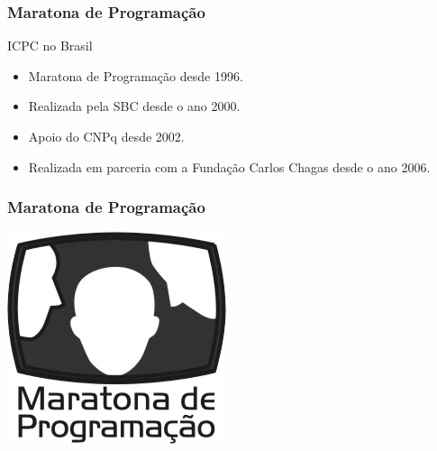 \begin{frame}
\frametitle{Maratona de Programação}
\begin{block}{ICPC no Brasil}
\begin{itemize}
	\item Maratona de Programação desde 1996.
	\item Realizada pela SBC desde o ano 2000.
	\item Apoio do CNPq desde 2002.
	\item Realizada em parceria com a Fundação Carlos Chagas desde o ano 2006.
\end{itemize}
\end{block}
\begin{center}
\begin{minipage}{.4\textwidth}
\frametitle{Maratona de Programação}
	\centering
	\includegraphics[width=.75\textwidth]{logo/logomdp}
\end{minipage}
\end{center}
\end{frame}

